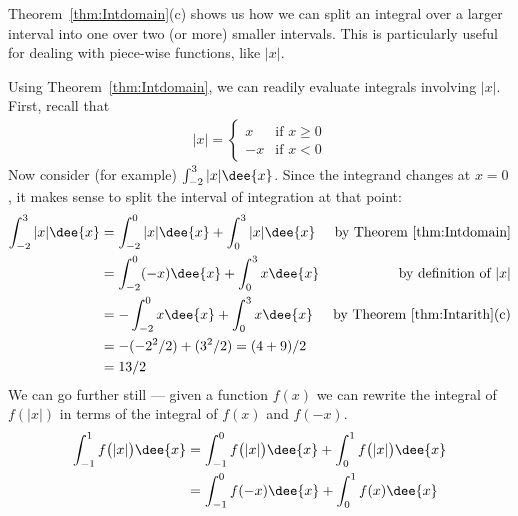 Theorem~\ref{thm:Intdomain}(c) shows us how we can split an integral over a
larger interval into one over two (or more) smaller intervals. This is
particularly useful for dealing with piece-wise functions, like $|x|$.
\begin{eg}\label{eg:INTPROPabs}
Using Theorem~\ref{thm:Intdomain}, we can readily evaluate integrals involving
$|x|$. First, recall that
\begin{align*}
|x|=\begin{cases}
          x & \text{if $x\ge 0$} \\
         -x & \text{if $x< 0$}
    \end{cases}
\end{align*}
Now consider (for example) $\int_{-2}^3 |x| \dee{x}$. Since the integrand
changes at $x=0$, it makes sense to split the interval of integration at that
point:
\begin{align*}
  \int_{-2}^3 |x| \dee{x}
&= \int_{-2}^0 |x| \dee{x} + \int_0^3 |x| \dee{x}
&\text{by Theorem~\ref{thm:Intdomain}}\\
&= \int_{-2}^0 (-x) \dee{x} + \int_0^3 x \dee{x}
&\text{by definition of $|x|$}\\
&= -\int_{-2}^0 x\dee{x} + \int_0^3 x \dee{x}
&\text{by Theorem~\ref{thm:Intarith}(c)}\\
&= - (-2^2/2) + (3^2/2) = (4+9)/2\\
&= 13/2
\end{align*}
We can go further still --- given a function $f(x)$ we can rewrite
the integral of $f(|x|)$ in terms of the integral of $f(x)$ and $f(-x)$.
\begin{align*}
\int_{-1}^1 f\big(|x|\big)\dee{x}
& = \int_{-1}^0 f\big(|x|\big)\dee{x}+ \int_0^1 f\big(|x|\big)\dee{x} \\
& = \int_{-1}^0 f(-x)\dee{x}+ \int_0^1 f(x)\dee{x}
\end{align*}
\end{eg}

